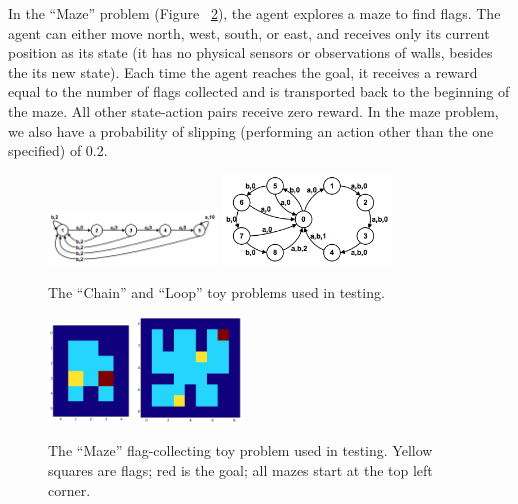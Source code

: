 \documentclass[10pt, twocolumn, twoside]{article}
\begin{document}
In the ``Maze'' problem (Figure ~\ref{fig:maze}), the agent explores a maze to find
flags. The agent can either move north, west, south, or east, and receives only its
current position as its state (it has no physical sensors or observations of walls,
besides the its new state). Each time the agent reaches the goal, it receives a reward
equal to the number of flags collected and is transported back to the beginning of the
maze. All other state-action pairs receive zero reward. In the maze problem, we also
have a probability of slipping (performing an action other than the one specified) of 0.2.

\begin{figure}
\centering
\includegraphics[width=0.4\textwidth]{chain.png}
\includegraphics[width=0.4\textwidth]{loop.png}
\caption{\label{fig:chainloop} The ``Chain'' and ``Loop'' toy problems used in testing.}
\end{figure}

\begin{figure}
\centering
\includegraphics[width=0.2\textwidth]{easymaze.png}
\includegraphics[width=0.25\textwidth]{hardmaze.png}
\caption{\label{fig:maze} The ``Maze'' flag-collecting toy problem used in testing.
Yellow squares are flags; red is the goal; all mazes start at the top left corner.}
\end{figure}
\end{document}
